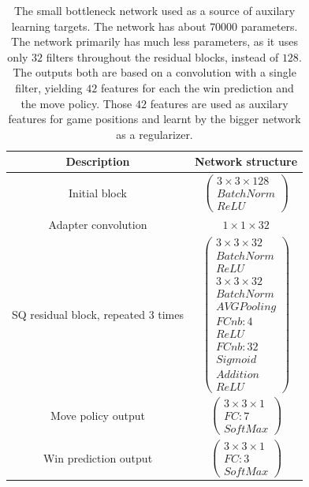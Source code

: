 \documentclass[12pt,onecolumn,oneside,titlepage]{article}
\begin{document}
\begin{table} [H]
 \centering
  \begin{tabular}{c | c }
   Description & Network structure \\
   \hline
   \hline
   Initial block & $\begin{pmatrix} 3 \times 3 \times 128 \\ BatchNorm \\ ReLU \end{pmatrix}$ \\
   \hline
   Adapter convolution & $1 \times 1 \times 32$ \\
   \hline
   SQ residual block, repeated $3$ times & $\begin{pmatrix} 3 \times 3 \times 32 \\ BatchNorm \\ ReLU \\ 3 \times 3 \times 32 \\ BatchNorm \\ AVG Pooling \\ FCnb: 4 \\ ReLU \\ FCnb: 32 \\ Sigmoid \\ Addition \\ ReLU \end{pmatrix}$ \\
   \hline 
   Move policy output & $\begin{pmatrix} 3 \times 3 \times 1 \\ FC: 7 \\ SoftMax \end{pmatrix}$ \\
   \hline
   Win prediction output & $\begin{pmatrix} 3 \times 3 \times 1 \\ FC: 3 \\ SoftMax \end{pmatrix}$
  \end{tabular}
  \caption{The small bottleneck network used as a source of auxilary learning targets. The network has about $70000$ parameters.
  The network primarily has much less parameters, as it uses only $32$ filters throughout the residual blocks, instead of $128$. The outputs both are based on a convolution with a single filter, yielding $42$ features for each the win prediction and the move policy. Those $42$
  features are used as auxilary features for game positions and learnt by the bigger network as a regularizer.}
  \label{fig:sq_bottleneck_network}
\end{table}
\end{document}
